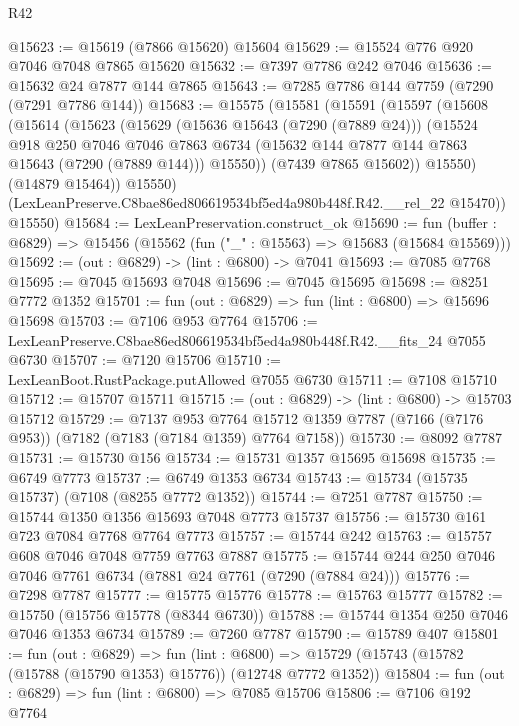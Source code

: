\begin{lexlean}{R42}
\begin{coremodule}
{@15623 := @15619 (@7866 @15620) @15604
@15629 := @15524 @776 @920 @7046 @7048 @7865 @15620
@15632 := @7397 @7786 @242 @7046
@15636 := @15632 @24 @7877 @144 @7865
@15643 := @7285 @7786 @144 @7759 (@7290 (@7291 @7786 @144))
@15683 := @15575
    (@15581
      (@15591
        (@15597
          (@15608
            (@15614
              (@15623
                (@15629
                  (@15636 @15643 (@7290 (@7889 @24)))
                  (@15524
                    @918
                    @250
                    @7046
                    @7046
                    @7863
                    @6734
                    (@15632 @144 @7877 @144 @7863 @15643 (@7290 (@7889 @144)))
                    @15550))
                (@7439 @7865 @15602))
              @15550)
            (@14879 @15464))
          @15550)
        (LexLeanPreserve.C8bae86ed806619534bf5ed4a980b448f.R42.__rel_22 @15470))
      @15550)
@15684 := LexLeanPreservation.construct_ok
@15690 := fun (buffer : @6829) => @15456 (@15562 (fun ("_" : @15563) => @15683 (@15684 @15569)))
@15692 := (out : @6829) -> (lint : @6800) -> @7041
@15693 := @7085 @7768
@15695 := @7045 @15693 @7048
@15696 := @7045 @15695
@15698 := @8251 @7772 @1352
@15701 := fun (out : @6829) => fun (lint : @6800) => @15696 @15698
@15703 := @7106 @953 @7764
@15706 := LexLeanPreserve.C8bae86ed806619534bf5ed4a980b448f.R42.__fits_24 @7055 @6730
@15707 := @7120 @15706
@15710 := LexLeanBoot.RustPackage.putAllowed @7055 @6730
@15711 := @7108 @15710
@15712 := @15707 @15711
@15715 := (out : @6829) -> (lint : @6800) -> @15703 @15712
@15729 := @7137
    @953
    @7764
    @15712
    @1359
    @7787
    (@7166 (@7176 @953))
    (@7182 (@7183 (@7184 @1359) @7764 @7158))
@15730 := @8092 @7787
@15731 := @15730 @156
@15734 := @15731 @1357 @15695 @15698
@15735 := @6749 @7773
@15737 := @6749 @1353 @6734
@15743 := @15734 (@15735 @15737) (@7108 (@8255 @7772 @1352))
@15744 := @7251 @7787
@15750 := @15744 @1350 @1356 @15693 @7048 @7773 @15737
@15756 := @15730 @161 @723 @7084 @7768 @7764 @7773
@15757 := @15744 @242
@15763 := @15757 @608 @7046 @7048 @7759 @7763 @7887
@15775 := @15744 @244 @250 @7046 @7046 @7761 @6734 (@7881 @24 @7761 (@7290 (@7884 @24)))
@15776 := @7298 @7787
@15777 := @15775 @15776
@15778 := @15763 @15777
@15782 := @15750 (@15756 @15778 (@8344 @6730))
@15788 := @15744 @1354 @250 @7046 @7046 @1353 @6734
@15789 := @7260 @7787
@15790 := @15789 @407
@15801 := fun (out : @6829) =>
  fun (lint : @6800) => @15729 (@15743 (@15782 (@15788 (@15790 @1353) @15776)) (@12748 @7772 @1352))
@15804 := fun (out : @6829) => fun (lint : @6800) => @7085 @15706
@15806 := @7106 @192 @7764
}
\end{coremodule}
\end{lexlean}
